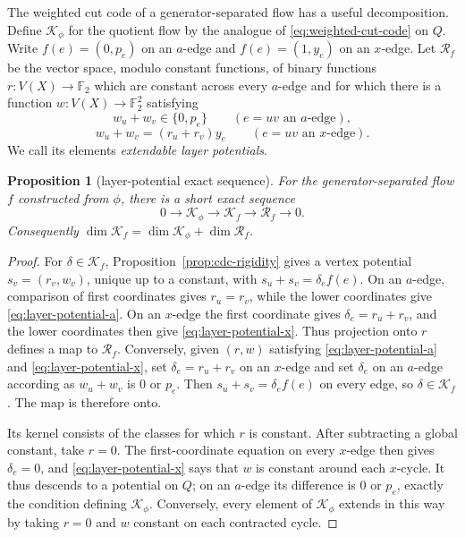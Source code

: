 \documentclass[11pt,a4paper]{article}
\newtheorem{proposition}[theorem]{Proposition}
\theoremstyle{definition}
\theoremstyle{remark}
\begin{document}
The weighted cut code of a generator-separated flow has a useful decomposition.  Define $\mathcal K_\phi$ for the quotient flow by the analogue of \eqref{eq:weighted-cut-code} on $Q$.  Write $f(e)=(0,p_e)$ on an $a$-edge and $f(e)=(1,y_e)$ on an $x$-edge.  Let $\mathcal R_f$ be the vector space, modulo constant functions, of binary functions $r\colon V(X)\to\mathbb F_2$ which are constant across every $a$-edge and for which there is a function $w\colon V(X)\to\mathbb F_2^2$ satisfying
\begin{equation}\label{eq:layer-potential-a}
 w_u+w_v\in\{0,p_e\}\qquad(e=uv\text{ an }a\text{-edge}),
\end{equation}
\begin{equation}\label{eq:layer-potential-x}
 w_u+w_v=(r_u+r_v)y_e\qquad(e=uv\text{ an }x\text{-edge}).
\end{equation}
We call its elements \emph{extendable layer potentials}.

\begin{proposition}[layer-potential exact sequence]\label{prop:layer-potential}
For the generator-separated flow $f$ constructed from $\phi$, there is a short exact sequence
\[
 0\longrightarrow\mathcal K_\phi\longrightarrow\mathcal K_f
 \longrightarrow\mathcal R_f\longrightarrow0.
\]
Consequently $\dim\mathcal K_f=\dim\mathcal K_\phi+\dim\mathcal R_f$.
\end{proposition}
\begin{proof}
For $\delta\in\mathcal K_f$, Proposition~\ref{prop:cdc-rigidity} gives a vertex potential $s_v=(r_v,w_v)$, unique up to a constant, with $s_u+s_v=\delta_e f(e)$.  On an $a$-edge, comparison of first coordinates gives $r_u=r_v$, while the lower coordinates give \eqref{eq:layer-potential-a}.  On an $x$-edge the first coordinate gives $\delta_e=r_u+r_v$, and the lower coordinates then give \eqref{eq:layer-potential-x}.  Thus projection onto $r$ defines a map to $\mathcal R_f$.  Conversely, given $(r,w)$ satisfying \eqref{eq:layer-potential-a} and \eqref{eq:layer-potential-x}, set $\delta_e=r_u+r_v$ on an $x$-edge and set $\delta_e$ on an $a$-edge according as $w_u+w_v$ is $0$ or $p_e$.  Then $s_u+s_v=\delta_e f(e)$ on every edge, so $\delta\in\mathcal K_f$.  The map is therefore onto.

Its kernel consists of the classes for which $r$ is constant.  After subtracting a global constant, take $r=0$.  The first-coordinate equation on every $x$-edge then gives $\delta_e=0$, and \eqref{eq:layer-potential-x} says that $w$ is constant around each $x$-cycle.  It thus descends to a potential on $Q$; on an $a$-edge its difference is $0$ or $p_e$, exactly the condition defining $\mathcal K_\phi$.  Conversely, every element of $\mathcal K_\phi$ extends in this way by taking $r=0$ and $w$ constant on each contracted cycle.
\end{proof}
\end{document}
